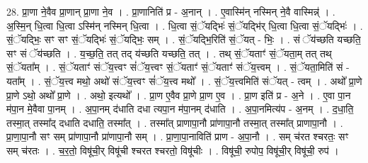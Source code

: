 \documentclass[17pt]{extarticle}
\begin{document}
28. प्रा॒णा ने॒वैव प्रा॒णान् प्रा॒णा ने॒व । . प्रा॒णानिति॑ प्र - अ॒नान् । . ए॒वास्मि॑न् नस्मिन् ने॒वै वास्मिन्न्॑ । . अ॒स्मि॒न् धि॒त्वा धि॒त्वा ऽस्मि॑न् नस्मिन् धि॒त्वा । . धि॒त्वा सं॒ॅयद्भिः॑ सं॒ॅयद्भि॑र् धि॒त्वा धि॒त्वा सं॒ॅयद्भिः॑ । . सं॒ॅयद्भिः॒ सꣳ सꣳ सं॒ॅयद्भिः॑ सं॒ॅयद्भिः॒ सम् । . सं॒ॅयद्भि॒रिति॑ सं॒ॅयत् - भिः॒ । . सं ॅय॑च्छति यच्छति॒ सꣳ सं ॅय॑च्छति । . य॒च्छ॒ति॒ तत् तद् य॑च्छति यच्छति॒ तत् । . तथ् सं॒ॅयताꣳ॑ सं॒ॅयता॒म् तत् तथ् सं॒ॅयता᳚म् । . सं॒ॅयताꣳ॑ संॅय॒त्त्वꣳ सं॑ॅय॒त्त्वꣳ सं॒ॅयताꣳ॑ सं॒ॅयताꣳ॑ संॅय॒त्त्वम् । . सं॒ॅयता॒मिति॑ सं - यता᳚म् । . सं॒ॅय॒त्त्व मथो॒ अथो॑ संॅय॒त्त्वꣳ सं॑ॅय॒त्त्व मथो᳚ । . सं॒ॅय॒त्त्वमिति॑ संॅयत् - त्वम् । . अथो᳚ प्रा॒णे प्रा॒णे ऽथो॒ अथो᳚ प्रा॒णे । . अथो॒ इत्यथो᳚ । . प्रा॒ण ए॒वैव प्रा॒णे प्रा॒ण ए॒व । . प्रा॒ण इति॑ प्र - अ॒ने । . ए॒वा पा॒न म॑पा॒न मे॒वैवा पा॒नम् । . अ॒पा॒नम् द॑धाति दधा त्यपा॒न म॑पा॒नम् द॑धाति । . अ॒पा॒नमित्य॑प - अ॒नम् । . द॒धा॒ति॒ तस्मा॒त् तस्मा᳚द् दधाति दधाति॒ तस्मा᳚त् । . तस्मा᳚त् प्राणापा॒नौ प्रा॑णापा॒नौ तस्मा॒त् तस्मा᳚त् प्राणापा॒नौ । . प्रा॒णा॒पा॒नौ सꣳ सम् प्रा॑णापा॒नौ प्रा॑णापा॒नौ सम् । . प्रा॒णा॒पा॒नाविति॑ प्राण - अ॒पा॒नौ । . सम् च॑रत श्चरतः॒ सꣳ सम् च॑रतः । . च॒र॒तो॒ विषू॑ची॒र् विषू॑ची श्चरत श्चरतो॒ विषू॑चीः । . विषू॑ची॒ रुपोप॒ विषू॑ची॒र् विषू॑ची॒ रुप॑ । \newline
\end{document}

